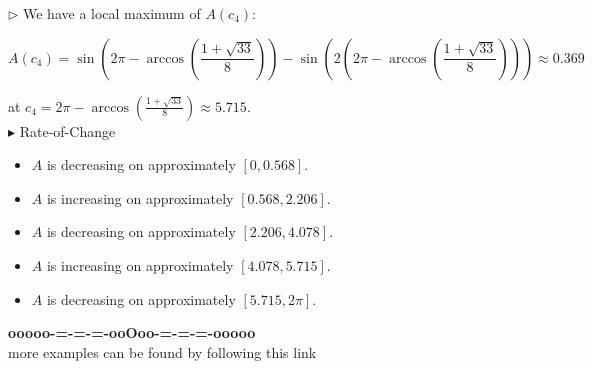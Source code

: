 \documentclass{ximera}
\begin{document}
$\rhd$ We have a local maximum of $A(c_4)$:


\[  A(c_4) = \sin\left(   2\pi - \arccos\left(\frac{1 + \sqrt{33}}{8}\right)   \right) - \sin\left(2  (2\pi - \arccos\left(\frac{1 + \sqrt{33}}{8}\right))  \right)  \approx 0.369  \]




at $c_4 = 2\pi - \arccos\left(\frac{1 + \sqrt{33}}{8}\right) \approx 5.715$.   \\














$\blacktriangleright$ Rate-of-Change

\begin{itemize}
\item $A$ is decreasing on approximately $[0, 0.568]$.
\item $A$ is increasing on approximately $[0.568, 2.206]$.
\item $A$ is decreasing on approximately $[2.206, 4.078]$.
\item $A$ is increasing on approximately $[4.078, 5.715]$.
\item $A$ is decreasing on approximately $[5.715, 2\pi]$.
\end{itemize}








\begin{center}
\textbf{\textcolor{green!50!black}{ooooo-=-=-=-ooOoo-=-=-=-ooooo}} \\

more examples can be found by following this link\\ 

\end{center}
\end{document}
